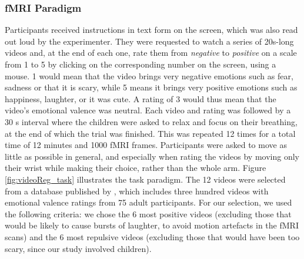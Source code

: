 \subsubsection{fMRI Paradigm} 
Participants received instructions in text form on the screen, which was also read out loud by the experimenter. They were requested to watch a series of 20s-long videos and, at the end of each one, rate them from \textit{negative} to \textit{positive} on a scale from 1 to 5 by clicking on the corresponding number on the screen, using a mouse. 1 would mean that the video brings very negative emotions such as fear, sadness or that it is scary, while 5 means it brings very positive emotions such as happiness, laughter, or it was cute. A rating of 3 would thus mean that the video's emotional valence was neutral. Each video and rating was followed by a 30 s interval where the children were asked to relax and focus on their breathing, at the end of which the trial was finished. This was repeated 12 times for a total time of 12 minutes and 1000 fMRI frames.  Participants were asked to move as little as possible in general, and especially when rating the videos by moving only their wrist while making their choice, rather than the whole arm. Figure \ref{fig:videoReg_task} illustrates the task paradigm. The 12 videos were selected from a database published by \citet{Samson2016}, which includes three hundred videos with emotional valence ratings from 75 adult participants. For our selection, we used the following criteria: we chose the 6 most positive videos (excluding those that would be likely to cause bursts of laughter, to avoid motion artefacts in the fMRI scans) and the 6 most repulsive videos (excluding those that would have been too scary, since our study involved children).


